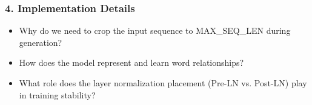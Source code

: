 \subsubsection*{4. Implementation Details}
\begin{itemize}
    \item Why do we need to crop the input sequence to MAX\_SEQ\_LEN during generation?
    \item How does the model represent and learn word relationships?
    \item What role does the layer normalization placement (Pre-LN vs. Post-LN) play in training stability?
\end{itemize}
